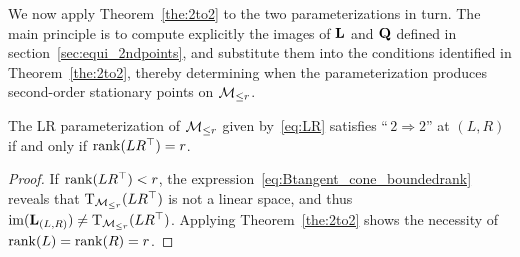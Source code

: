 We now apply Theorem~\ref{the:2to2} to the two parameterizations in turn. The main principle is to compute explicitly the images of $\mathrm{\bf L}$ and $\mathrm{\bf Q}$ defined in section~\ref{sec:equi_2ndpoints}, and substitute them into the conditions identified in Theorem~\ref{the:2to2}, thereby determining when the parameterization produces second-order stationary points on $\mathcal{M}_{\le r}$.

\begin{proposition}\label{pro:LR_2to2}
    The LR parameterization of $\mathcal{M}_{\le r}$ given by~\eqref{eq:LR} satisfies ``\,$2\!\Rightarrow\!2$'' at $(L,R)$ if and only if $\operatorname{rank}(LR^\top)=r$.
\end{proposition}
\begin{proof}
If $\operatorname{rank}(LR^\top)<r$, the expression~\eqref{eq:Btangent_cone_boundedrank} reveals that $\mathrm{T}_{\mathcal{M}_{\le r}}(LR^\top)$ is not a linear space, and thus $\operatorname{im}(\mathrm{\bf L}_{(L,R)})\neq \mathrm{T}_{\mathcal{M}_{\le r}}(LR^\top)$. Applying Theorem~\ref{the:2to2} shows the necessity of $\operatorname{rank}(L)=\operatorname{rank}(R)=r$.


\end{proof}
